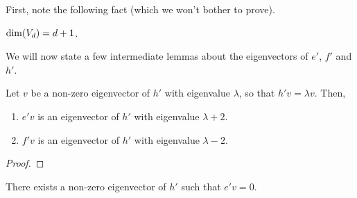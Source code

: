 First, note the following fact (which we won't bother to prove).

\begin{boxlemma}
    $\dim\!\left( V_d \right) = d + 1$.
\end{boxlemma}

We will now state a few intermediate lemmas about the eigenvectors of $e'$, $f'$ and $h'$.

\begin{boxlemma}
    Let $v$ be a non-zero eigenvector of $h'$ with eigenvalue $\lambda$, so that $h'v = \lambda v$. Then,
    \begin{enumerate}[label = \normalfont \arabic*., noitemsep]
        \item $e'v$ is an eigenvector of $h'$ with eigenvalue $\lambda + 2$.
        \item $f'v$ is an eigenvector of $h'$ with eigenvalue $\lambda - 2$.
    \end{enumerate}
\end{boxlemma}
\begin{proof}
    \sorry %
\end{proof}
\begin{boxlemma}
    There exists a non-zero eigenvector of $h'$ such that $e' v = 0$.
\end{boxlemma}
